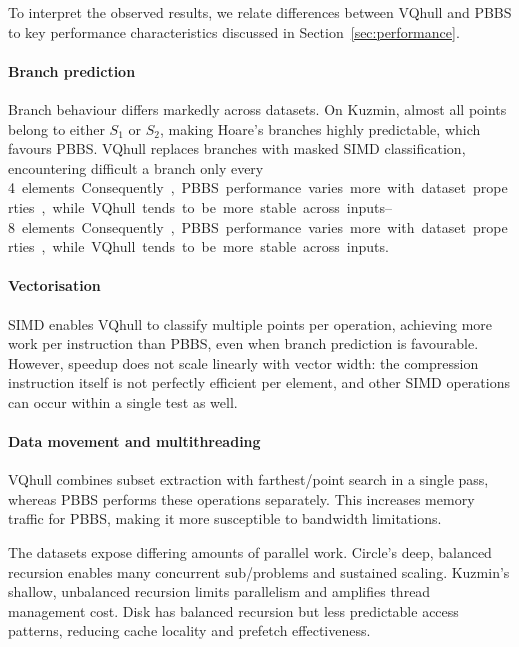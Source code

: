 To interpret the observed results, we relate differences between VQhull and PBBS to key performance characteristics discussed in Section~\ref{sec:performance}.

\paragraph{Branch prediction}
Branch behaviour differs markedly across datasets.
On Kuzmin, almost all points belong to either $S_1$ or $S_2$, making Hoare's branches highly predictable, which favours PBBS.
VQhull replaces branches with masked SIMD classification, encountering difficult a branch only every \qtyrange{4}{8} elements.
Consequently, PBBS performance varies more with dataset properties, while VQhull tends to be more stable across inputs.

\paragraph{Vectorisation}
SIMD enables VQhull to classify multiple points per operation, achieving more work per instruction than PBBS, even when branch prediction is favourable.
However, speedup does not scale linearly with vector width: the compression instruction itself is not perfectly efficient per element, and other SIMD operations can occur within a single test as well.

\paragraph{Data movement and multithreading}
VQhull combines subset extraction with farthest\-/point search in a single pass, whereas PBBS performs these operations separately.
This increases memory traffic for PBBS, making it more susceptible to bandwidth limitations.

The datasets expose differing amounts of parallel work.
Circle's deep, balanced recursion enables many concurrent sub\-/problems and sustained scaling.
Kuzmin's shallow, unbalanced recursion limits parallelism and amplifies thread management cost.
Disk has balanced recursion but less predictable access patterns, reducing cache locality and prefetch effectiveness.

